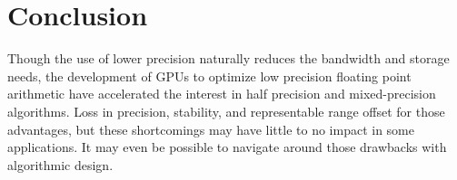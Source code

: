 \documentclass[review,onefignum,onetabnum]{siamart190516}
\newcommand{\bb}[1]{\mathbf{#1}}
\begin{document}

\section{Conclusion}
Though the use of lower precision naturally reduces the bandwidth and storage needs, the development of GPUs to optimize low precision floating point arithmetic have accelerated the interest in half precision and mixed-precision algorithms. %
Loss in precision, stability, and representable range offset for those advantages, but these shortcomings may have little to no impact in some applications.
It may even be possible to navigate around those drawbacks with algorithmic design. \par 
\end{document}
